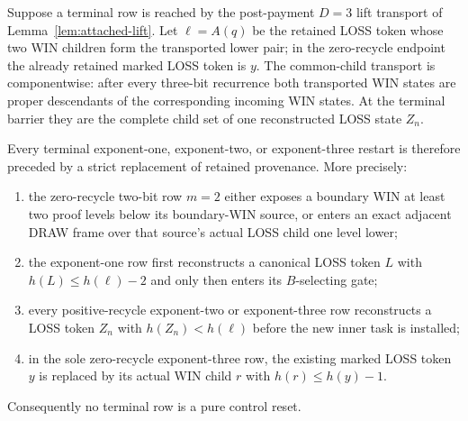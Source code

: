 \begin{lemma}
\label{lem:terminal-pay}
Suppose a terminal row is reached by the post-payment $D=3$ lift transport of
Lemma~\ref{lem:attached-lift}.  Let $\ell=A(q)$ be the retained LOSS token
whose two WIN children form the transported lower pair; in the zero-recycle
endpoint the already retained marked LOSS token is $y$.  The common-child transport is componentwise: after every
three-bit recurrence both transported WIN states are proper descendants of
the corresponding incoming WIN states.  At the terminal barrier they are
the complete child set of one reconstructed LOSS state $Z_n$.

Every terminal exponent-one, exponent-two, or exponent-three restart is
therefore preceded by a strict replacement of retained provenance.  More
precisely:
\begin{enumerate}[label=(\alph*)]
\item the zero-recycle two-bit row $m=2$ either exposes a boundary WIN at
      least two proof levels below its boundary-WIN source, or enters an exact
      adjacent DRAW frame over that source's actual LOSS child one level
      lower;
\item the exponent-one row first reconstructs a canonical LOSS token $L$
      with $h(L)\le h(\ell)-2$ and only then enters its $B$-selecting gate;
\item every positive-recycle exponent-two or exponent-three row reconstructs
      a LOSS token $Z_n$ with $h(Z_n)<h(\ell)$ before the new inner task is
      installed;
\item in the sole zero-recycle exponent-three row, the existing marked LOSS
      token $y$ is replaced by its actual WIN child $r$ with
      $h(r)\le h(y)-1$.
\end{enumerate}
Consequently no terminal row is a pure control reset.
\end{lemma}

